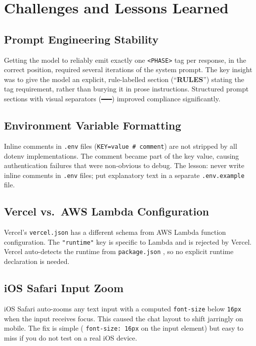 \documentclass[12pt, a4paper]{article}
\newcommand{\inlinecode}[1]{%
  \colorbox{inlinecode!20}{\texttt{\small #1}}%
}
\begin{document}
\section{Challenges and Lessons Learned}

\subsection{Prompt Engineering Stability}

Getting the model to reliably emit exactly one \inlinecode{<PHASE>} tag per response,
in the correct position, required several iterations of the system prompt. The key
insight was to give the model an explicit, rule-labelled section (``\textbf{RULES}'')
stating the tag requirement, rather than burying it in prose instructions. Structured
prompt sections with visual separators (\texttt{━━━}) improved compliance significantly.

\subsection{Environment Variable Formatting}

Inline comments in \inlinecode{.env} files (\texttt{KEY=value \# comment}) are not
stripped by all dotenv implementations. The comment became part of the key value,
causing authentication failures that were non-obvious to debug. The lesson: never
write inline comments in \inlinecode{.env} files; put explanatory text in a separate
\inlinecode{.env.example} file.

\subsection{Vercel vs.\ AWS Lambda Configuration}

Vercel's \inlinecode{vercel.json} has a different schema from AWS Lambda function
configuration. The \inlinecode{"runtime"} key is specific to Lambda and is rejected
by Vercel. Vercel auto-detects the runtime from \inlinecode{package.json}, so no
explicit runtime declaration is needed.

\subsection{iOS Safari Input Zoom}

iOS Safari auto-zooms any text input with a computed \inlinecode{font-size} below
\inlinecode{16px} when the input receives focus. This caused the chat layout to shift
jarringly on mobile. The fix is simple (\inlinecode{font-size: 16px} on the input
element) but easy to miss if you do not test on a real iOS device.
\end{document}
